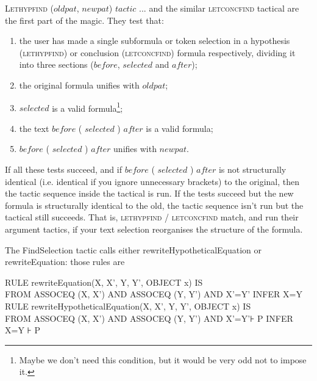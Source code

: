 \textsc{Lethypfind} ($\mathit{oldpat}$, $\mathit{newpat}$) $\mathit{tactic}$ ... and the similar \textsc{letconcfind} tactical are the first part of the magic. They test that: 
\begin{enumerate}
\item the user has made a single subformula or token selection in a hypothesis (\textsc{lethypfind}) or conclusion (\textsc{letconcfind}) formula respectively, dividing it into three sections ($\mathit{before}$, $\mathit{selected}$ and $\mathit{after}$);

\item the original formula unifies with $\mathit{oldpat}$;

\item $\mathit{selected}$ is a valid formula\footnote{Maybe we don't need this condition, but it would be very odd not to impose it.};

\item the text $\mathit{before}$ ( $\mathit{selected}$ ) $\mathit{after}$ is a valid formula;

\item $\mathit{before}$ ( $\mathit{selected}$ ) $\mathit{after}$ unifies with $\mathit{newpat}$.
\end{enumerate}
If all these tests succeed, and if $\mathit{before}$ ( $\mathit{selected}$ ) $\mathit{after}$ is not structurally identical (i.e. identical if you ignore unnecessary brackets) to the original, then the tactic sequence inside the tactical is run. If the tests succeed but the new formula is structurally identical to the old, the tactic sequence isn't run but the tactical still succeeds. That is, \textsc{lethypfind} / \textsc{letconcfind} match, and run their argument tactics, if your text selection reorganises the structure of the formula.

The FindSelection tactic calls either rewriteHypotheticalEquation or rewriteEquation: those rules are%
\begin{japeish}
RULE rewriteEquation(X, X', Y, Y', OBJECT x) IS\\
\tab FROM ASSOCEQ (X, X') AND ASSOCEQ (Y, Y') AND X'=Y' INFER X=Y\\
RULE rewriteHypotheticalEquation(X, X', Y, Y', OBJECT x) IS\\
\tab FROM ASSOCEQ (X, X') AND ASSOCEQ (Y, Y') AND X'=Y'⊦ P INFER X=Y ⊦ P
\end{japeish}

